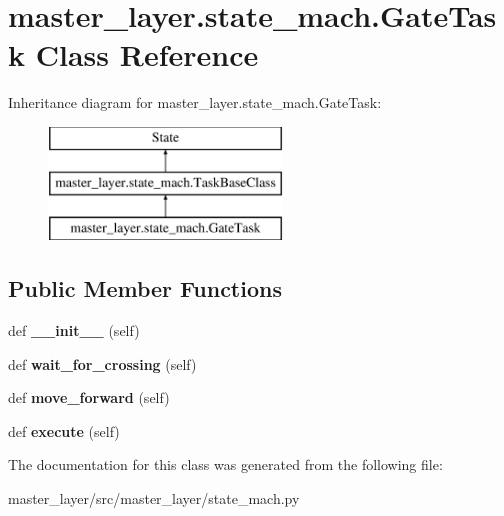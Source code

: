\hypertarget{classmaster__layer_1_1state__mach_1_1GateTask}{}\section{master\+\_\+layer.\+state\+\_\+mach.\+Gate\+Task Class Reference}
\label{classmaster__layer_1_1state__mach_1_1GateTask}
Inheritance diagram for master\+\_\+layer.\+state\+\_\+mach.\+Gate\+Task\+:\begin{figure}[H]
\begin{center}
\leavevmode
\includegraphics[height=3.000000cm]{classmaster__layer_1_1state__mach_1_1GateTask}
\end{center}
\end{figure}
\subsection*{Public Member Functions}
\begin{DoxyCompactItemize}
\item 
\mbox{\label{classmaster__layer_1_1state__mach_1_1GateTask_a9b03103ec10e1e177fd898d94f456bd9}} 
def {\bfseries \+\_\+\+\_\+init\+\_\+\+\_\+} (self)
\item 
\mbox{\label{classmaster__layer_1_1state__mach_1_1GateTask_a186ab7679ee691a49b2cdd4e15394ce9}} 
def {\bfseries wait\+\_\+for\+\_\+crossing} (self)
\item 
\mbox{\label{classmaster__layer_1_1state__mach_1_1GateTask_a5b76b2e464f2a805683430f963039337}} 
def {\bfseries move\+\_\+forward} (self)
\item 
\mbox{\label{classmaster__layer_1_1state__mach_1_1GateTask_afe32c860e9f85192bd584aba2868e3c4}} 
def {\bfseries execute} (self)
\end{DoxyCompactItemize}


The documentation for this class was generated from the following file\+:\begin{DoxyCompactItemize}
\item 
master\+\_\+layer/src/master\+\_\+layer/state\+\_\+mach.\+py\end{DoxyCompactItemize}
